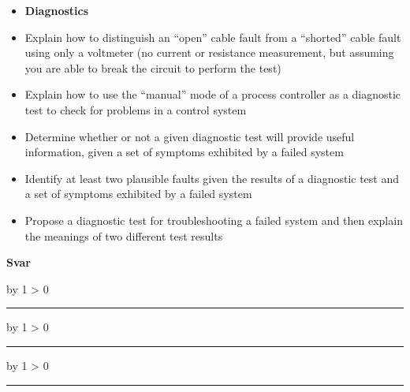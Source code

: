 \documentclass[12pt,a4paper]{book}
\def\svar{
           \advance\answnum by 1
           \ifnum \answnum > 0
                \hrule
                \vskip 3pt
                \leftline{Svar \the\answnum}
                \vskip 3pt \fi}
\begin{document}
\filbreak

\begin{itemize}
\item{} {\bf Diagnostics}
\item{} Explain how to distinguish an ``open'' cable fault from a ``shorted'' cable fault using only a voltmeter (no current or resistance measurement, but assuming you are able to break the circuit to perform the test)
\item{} Explain how to use the ``manual'' mode of a process controller as a diagnostic test to check for problems in a control system
\item{} Determine whether or not a given diagnostic test will provide useful information, given a set of symptoms exhibited by a failed system
\item{} Identify at least two plausible faults given the results of a diagnostic test and a set of symptoms exhibited by a failed system
\item{} Propose a diagnostic test for troubleshooting a failed system and then explain the meanings of two different test results
\end{itemize}



\vskip 10pt \filbreak 
\vfil \eject
\centerline{\bf Svar}
\vskip 5pt
\svar{} 

 
\vskip 10pt \filbreak 
\svar{} 


\vskip 10pt \filbreak 
\svar{} 


\vskip 10pt \filbreak 
\end{document}
